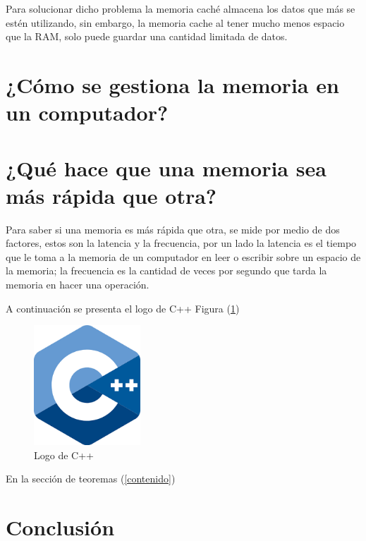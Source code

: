 \documentclass{article}
\begin{document}
Para solucionar dicho problema la memoria caché almacena los datos que más se estén utilizando, sin embargo, la memoria cache al tener mucho menos espacio que la RAM, solo puede guardar una cantidad limitada de datos.

\section{¿Cómo se gestiona la memoria en un computador?}


\section{¿Qué hace que una memoria sea más rápida que otra?}
Para saber si una memoria es más rápida que otra, se mide por medio de dos factores, estos son la latencia y la frecuencia, por un lado la latencia es el tiempo que le toma a la memoria de un computador en leer o escribir sobre un espacio de la memoria\cite{Salazar}; la frecuencia es la cantidad de veces por segundo que tarda la memoria en hacer una operación.

A continuación se presenta el logo de C++ Figura (\ref{fig:cpplogo})
\begin{figure}[h]
\includegraphics[width=4cm]{cpplogo.png}
\centering
\caption{Logo de C++}
\label{fig:cpplogo}
\end{figure}

En la sección de teoremas (\ref{contenido})

\section{Conclusión} \label{conclulsion}



\end{document}

